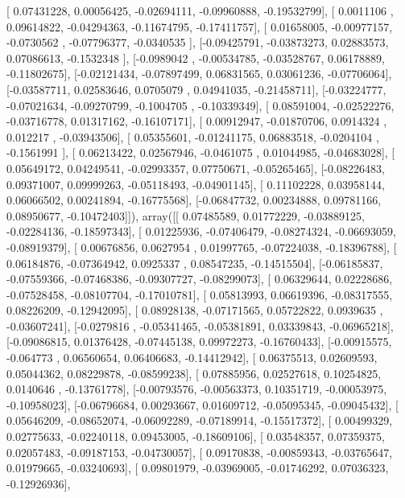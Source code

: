 \documentclass{article}
\begin{document}
       [ 0.07431228,  0.00056425, -0.02694111, -0.09960888, -0.19532799],
       [ 0.0011106 ,  0.09614822, -0.04294363, -0.11674795, -0.17411757],
       [ 0.01658005, -0.00977157, -0.0730562 , -0.07796377, -0.0340535 ],
       [-0.09425791, -0.03873273,  0.02883573,  0.07086613, -0.1532348 ],
       [-0.0989042 , -0.00534785, -0.03528767,  0.06178889, -0.11802675],
       [-0.02121434, -0.07897499,  0.06831565,  0.03061236, -0.07706064],
       [-0.03587711,  0.02583646,  0.0705079 ,  0.04941035, -0.21458711],
       [-0.03224777, -0.07021634, -0.09270799, -0.1004705 , -0.10339349],
       [ 0.08591004, -0.02522276, -0.03716778,  0.01317162, -0.16107171],
       [ 0.00912947, -0.01870706,  0.0914324 ,  0.012217  , -0.03943506],
       [ 0.05355601, -0.01241175,  0.06883518, -0.0204104 , -0.1561991 ],
       [ 0.06213422,  0.02567946, -0.0461075 ,  0.01044985, -0.04683028],
       [ 0.05649172,  0.04249541, -0.02993357,  0.07750671, -0.05265465],
       [-0.08226483,  0.09371007,  0.09999263, -0.05118493, -0.04901145],
       [ 0.11102228,  0.03958144,  0.06066502,  0.00241894, -0.16775568],
       [-0.06847732,  0.00234888,  0.09781166,  0.08950677, -0.10472403]]), array([[ 0.07485589,  0.01772229, -0.03889125, -0.02284136, -0.18597343],
       [ 0.01225936, -0.07406479, -0.08274324, -0.06693059, -0.08919379],
       [ 0.00676856,  0.0627954 ,  0.01997765, -0.07224038, -0.18396788],
       [ 0.06184876, -0.07364942,  0.0925337 ,  0.08547235, -0.14515504],
       [-0.06185837, -0.07559366, -0.07468386, -0.09307727, -0.08299073],
       [ 0.06329644,  0.02228686, -0.07528458, -0.08107704, -0.17010781],
       [ 0.05813993,  0.06619396, -0.08317555,  0.08226209, -0.12942095],
       [ 0.08928138, -0.07171565,  0.05722822,  0.0939635 , -0.03607241],
       [-0.0279816 , -0.05341465, -0.05381891,  0.03339843, -0.06965218],
       [-0.09086815,  0.01376428, -0.07445138,  0.09972273, -0.16760433],
       [-0.00915575, -0.064773  ,  0.06560654,  0.06406683, -0.14412942],
       [ 0.06375513,  0.02609593,  0.05044362,  0.08229878, -0.08599238],
       [ 0.07885956,  0.02527618,  0.10254825,  0.0140646 , -0.13761778],
       [-0.00793576, -0.00563373,  0.10351719, -0.00053975, -0.10958023],
       [-0.06796684,  0.00293667,  0.01609712, -0.05095345, -0.09045432],
       [ 0.05646209, -0.08652074, -0.06092289, -0.07189914, -0.15517372],
       [ 0.00499329,  0.02775633, -0.02240118,  0.09453005, -0.18609106],
       [ 0.03548357,  0.07359375,  0.02057483, -0.09187153, -0.04730057],
       [ 0.09170838, -0.00859343, -0.03765647,  0.01979665, -0.03240693],
       [ 0.09801979, -0.03969005, -0.01746292,  0.07036323, -0.12926936],
\end{document}
